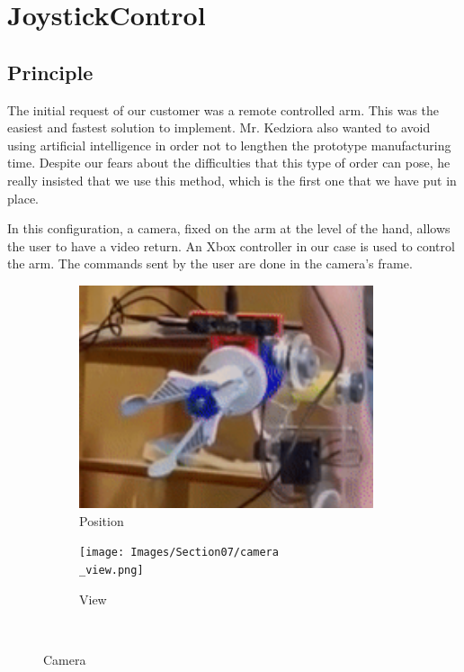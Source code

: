 \section{JoystickControl}\insertloftspace
\setcounter{figure}{0}\setcounter{table}{0}

\subsection{Principle}

The initial request of our customer was a remote controlled arm. This was the easiest and fastest solution to implement. Mr. Kedziora also wanted to avoid using artificial intelligence in order not to lengthen the prototype manufacturing time. Despite our fears about the difficulties that this type of order can pose, he really insisted that we use this method, which is the first one that we have put in place.

\bigbreak
In this configuration, a camera, fixed on the arm at the level of the hand, allows the user to have a video return. An Xbox controller in our case is used to control the arm. The commands sent by the user are done in the camera's frame.
\begin{figure}[H]
    \begin{subfigure}{.5\linewidth}
        \centering
        \includegraphics[width=0.95\textwidth]{Images/Section07/camera.png}
        \caption{Position}
        \label{fig:CameraRobot}
    \end{subfigure}%
    \begin{subfigure}{.5\linewidth}
        \centering
        \texttt{[image: Images/Section07/camera\\\_view.png]}
        \caption{View}
        \label{fig:CameraView}
    \end{subfigure}\\[1ex]
    \caption{Camera}
    \label{fig:Camera}
\end{figure}
\FloatBarrier

